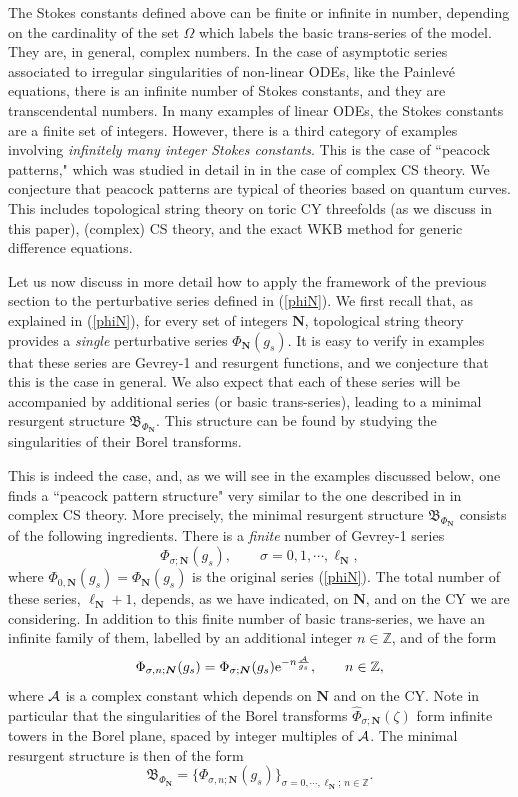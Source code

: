 \documentclass[a4paper,11pt]{article}
\theoremstyle{definition}
\newcommand{\CA}{{\cal A}}
\def\IZ{{\mathbb Z}}
\newcommand{\re}{{\rm e}}
\def\bN{{\boldsymbol{N}}}
\newcommand{\be}{\begin{equation}}
\newcommand{\ee}{\end{equation}}
\begin{document}
The Stokes constants defined above can be finite or infinite in number, depending on the cardinality of the set $\Omega$ which labels the basic trans-series of the model. 
They are, in general, complex numbers. In the case of asymptotic series associated to 
irregular singularities of non-linear ODEs, like the Painlev\'e equations, there is an infinite number of Stokes constants, and they are transcendental numbers. In many examples of linear ODEs, the Stokes constants are a finite set of integers. However, there is a third category of examples involving {\it infinitely many integer Stokes constants}. This is the case of ``peacock patterns," which was studied in detail in \cite{ggm1,ggm2} in the case of complex CS theory. We conjecture that peacock patterns are typical of theories based on quantum curves. 
This includes topological string theory on toric CY threefolds (as we discuss in this paper), (complex) CS theory, and the exact WKB method for generic difference equations. 

Let us now discuss in more detail how to apply the framework of the previous section to the 
perturbative series defined in (\ref{phiN}). We first recall that, as explained in (\ref{phiN}), for every set of integers $\bN$, 
topological string theory provides a {\it single} perturbative series $\Phi_{\bN}(g_s)$. It is easy to verify in examples that these series 
are Gevrey-1 and resurgent functions, and we conjecture that this is the case in general. 
We also expect that each of these series will be accompanied by 
additional series (or basic trans-series), leading to a minimal resurgent structure $\mathfrak{B}_{\Phi_{\bN}}$. This structure 
can be found by studying the singularities of their Borel transforms. 

This is indeed the case, and, as we will see in the examples discussed below, 
one finds a ``peacock pattern structure" very similar to the one described in \cite{ggm1, ggm2} in complex CS theory.  
More precisely, the minimal resurgent structure $\mathfrak{B}_{\Phi_{\bN}}$ consists of the following ingredients. There is a 
{\it finite} number of Gevrey-1 series 
%
\be
\label{bts}
\Phi_{\sigma ; \bN}(g_s), \qquad \sigma=0, 1, \cdots, \ell_{\bN}, 
\ee
%
where $ \Phi_{0,\bN} (g_s)= \Phi_{\bN} (g_s)$ is the original series (\ref{phiN}). The total number of these series, $\ell_{\bN}+1$, depends, as we 
have indicated, on $\bN$, and on the CY we are considering. In addition to this finite number of basic trans-series, we have an infinite family of them, labelled by an additional integer $n \in \IZ$, and of the form 
%
\be
\label{full-bts}
\Phi_{\sigma, n; \bN} (g_s)= \Phi_{\sigma ;\bN}(g_s) \re^{-n {\CA \over g_s}}, \qquad n \in \IZ, 
\ee
%
where $\CA$ is a complex constant which depends on $\bN$ and on the CY. Note in particular that the singularities of the Borel transforms $\widehat  \Phi_{\sigma ; \bN}(\zeta)$ form infinite towers in the Borel plane, spaced by integer multiples of $\CA$. The minimal resurgent structure is then of the form 
%
\be
\mathfrak{B}_{\Phi_{\bN}}=\{ \Phi_{\sigma, n; \bN} (g_s) \}_{\sigma=0, \cdots,  \ell_{\bN}; \, n \in \IZ}. 
\ee
%
\end{document}
